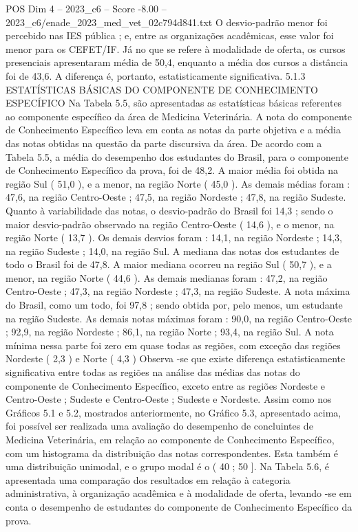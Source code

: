 \begin{textsample}{POS Dim 4 – 2023\_c6 – Score -8.00 – 2023\_c6/enade\_2023\_med\_vet\_02c794d841.txt}
O desvio-padrão menor foi percebido nas IES pública ; e, entre as organizações acadêmicas, esse valor foi menor para os CEFET/IF.
Já no que se refere à modalidade de oferta, os cursos presenciais apresentaram média de 50,4, enquanto a média dos cursos a distância foi de 43,6.
A diferença é, portanto, estatisticamente significativa. 5.1.3 ESTATÍSTICAS BÁSICAS DO COMPONENTE DE CONHECIMENTO ESPECÍFICO Na Tabela 5.5, são apresentadas as estatísticas básicas referentes ao componente específico da área de Medicina Veterinária.
A nota do componente de Conhecimento Específico leva em conta as notas da parte objetiva e a média das notas obtidas na questão da parte discursiva da área.
De acordo com a Tabela 5.5, a média do desempenho dos estudantes do Brasil, para o componente de Conhecimento Específico da prova, foi de 48,2.
A maior média foi obtida na região Sul ( 51,0 ), e a menor, na região Norte ( 45,0 ).
As demais médias foram : 47,6, na região Centro-Oeste ; 47,5, na região Nordeste ; 47,8, na região Sudeste.
Quanto à variabilidade das notas, o desvio-padrão do Brasil foi 14,3 ; sendo o maior desvio-padrão observado na região Centro-Oeste ( 14,6 ), e o menor, na região Norte ( 13,7 ).
Os demais desvios foram : 14,1, na região Nordeste ; 14,3, na região Sudeste ; 14,0, na região Sul.
A mediana das notas dos estudantes de todo o Brasil foi de 47,8.
A maior mediana ocorreu na região Sul ( 50,7 ), e a menor, na região Norte ( 44,6 ).
As demais medianas foram : 47,2, na região Centro-Oeste ; 47,3, na região Nordeste ; 47,3, na região Sudeste.
A nota máxima do Brasil, como um todo, foi 97,8 ; sendo obtida por, pelo menos, um estudante na região Sudeste.
As demais notas máximas foram : 90,0, na região Centro-Oeste ; 92,9, na região Nordeste ; 86,1, na região Norte ; 93,4, na região Sul.
A nota mínima nessa parte foi zero em quase todas as regiões, com exceção das regiões Nordeste ( 2,3 ) e Norte ( 4,3 ) Observa -se que existe diferença estatisticamente significativa entre todas as regiões na análise das médias das notas do componente de Conhecimento Específico, exceto entre as regiões Nordeste e Centro-Oeste ; Sudeste e Centro-Oeste ; Sudeste e Nordeste.
Assim como nos Gráficos 5.1 e 5.2, mostrados anteriormente, no Gráfico 5.3, apresentado acima, foi possível ser realizada uma avaliação do desempenho de concluintes de Medicina Veterinária, em relação ao componente de Conhecimento Específico, com um histograma da distribuição das notas correspondentes.
Esta também é uma distribuição unimodal, e o grupo modal é o ( 40 ; 50 ].
Na Tabela 5.6, é apresentada uma comparação dos resultados em relação à categoria administrativa, à organização acadêmica e à modalidade de oferta, levando -se em conta o desempenho de estudantes do componente de Conhecimento Específico da prova.

\end{textsample}
